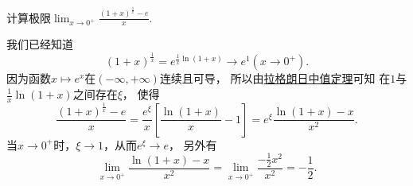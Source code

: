 \begin{example}
计算极限\(\lim_{x\to0^+} \frac{(1+x)^{\frac1x} - e}{x}\).
\begin{solution}
我们已经知道\[
	(1+x)^{\frac1x}
	= e^{\frac1x \ln(1+x)}
	\to e^1
	(x\to0^+).
\]
因为函数\(x \mapsto e^x\)在\((-\infty,+\infty)\)连续且可导，
所以由\hyperref[theorem:微分中值定理.拉格朗日中值定理]{拉格朗日中值定理}可知
在\(1\)与\(\frac1x \ln(1+x)\)之间存在\(\xi\)，
使得\[
	\frac{(1+x)^{\frac1x} - e}{x}
	= \frac{e^\xi}{x} \left[ \frac{\ln(1+x)}{x} - 1 \right]
	= e^\xi \frac{\ln(1+x) - x}{x^2}.
\]
当\(x\to0^+\)时，\(\xi\to1\)，从而\(e^\xi \to e\)，
另外有\[
	\lim_{x\to0^+} \frac{\ln(1+x) - x}{x^2}
	= \lim_{x\to0^+} \frac{-\frac12 x^2}{x^2}
	= -\frac12.
\]
\end{solution}
\end{example}

